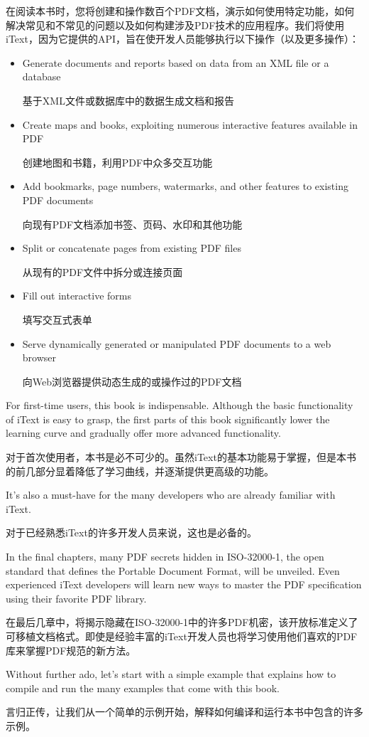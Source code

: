 \documentclass{book}
\begin{document}
在阅读本书时，您将创建和操作数百个PDF文档，演示如何使用特定功能，如何解决常见和不常见的问题以及如何构建涉及PDF技术的应用程序。我们将使用iText，因为它提供的API，旨在使开发人员能够执行以下操作（以及更多操作）：
\begin{itemize}
\item
Generate documents and reports based on data from an XML file or a database

基于XML文件或数据库中的数据生成文档和报告

\item
Create maps and books, exploiting numerous interactive features available in PDF

创建地图和书籍，利用PDF中众多交互功能
\item
Add bookmarks, page numbers, watermarks, and other features to existing PDF
documents

向现有PDF文档添加书签、页码、水印和其他功能

\item
Split or concatenate pages from existing PDF files

从现有的PDF文件中拆分或连接页面
\item
Fill out interactive forms

填写交互式表单
\item
Serve dynamically generated or manipulated PDF documents to a web browser 

向Web浏览器提供动态生成的或操作过的PDF文档
\end{itemize}
For first-time users, this book is indispensable. Although the basic functionality of iText is easy to grasp, the first parts of this book significantly lower the learning curve and gradually offer more advanced functionality.

对于首次使用者，本书是必不可少的。虽然iText的基本功能易于掌握，但是本书的前几部分显着降低了学习曲线，并逐渐提供更高级的功能。

It’s also a must-have for the many developers who are already familiar with iText.

对于已经熟悉iText的许多开发人员来说，这也是必备的。

In the final chapters, many PDF secrets hidden in ISO-32000-1, the open standard that defines the Portable Document Format, will be unveiled. Even experienced iText developers will learn new ways to master the PDF specification using their favorite PDF library.

在最后几章中，将揭示隐藏在ISO-32000-1中的许多PDF机密，该开放标准定义了可移植文档格式。即使是经验丰富的iText开发人员也将学习使用他们喜欢的PDF库来掌握PDF规范的新方法。

Without further ado, let’s start with a simple example that explains how to compile and run the many examples that come with this book.

言归正传，让我们从一个简单的示例开始，解释如何编译和运行本书中包含的许多示例。
\end{document}
